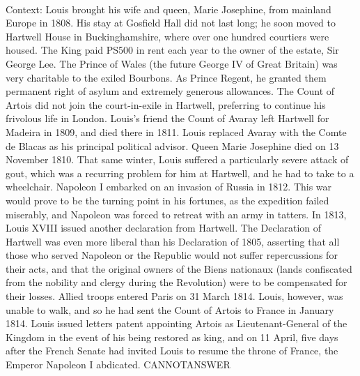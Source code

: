 \documentclass[11pt,a4paper, onecolumn]{article}
\begin{document}
\\ Context: Louis brought his wife and queen, Marie Josephine, from mainland Europe in 1808. His stay at Gosfield Hall did not last long; he soon moved to Hartwell House in Buckinghamshire, where over one hundred courtiers were housed. The King paid PS500 in rent each year to the owner of the estate, Sir George Lee. The Prince of Wales (the future George IV of Great Britain) was very charitable to the exiled Bourbons. As Prince Regent, he granted them permanent right of asylum and extremely generous allowances. The Count of Artois did not join the court-in-exile in Hartwell, preferring to continue his frivolous life in London. Louis's friend the Count of Avaray left Hartwell for Madeira in 1809, and died there in 1811. Louis replaced Avaray with the Comte de Blacas as his principal political advisor. Queen Marie Josephine died on 13 November 1810. That same winter, Louis suffered a particularly severe attack of gout, which was a recurring problem for him at Hartwell, and he had to take to a wheelchair. Napoleon I embarked on an invasion of Russia in 1812. This war would prove to be the turning point in his fortunes, as the expedition failed miserably, and Napoleon was forced to retreat with an army in tatters. In 1813, Louis XVIII issued another declaration from Hartwell. The Declaration of Hartwell was even more liberal than his Declaration of 1805, asserting that all those who served Napoleon or the Republic would not suffer repercussions for their acts, and that the original owners of the Biens nationaux (lands confiscated from the nobility and clergy during the Revolution) were to be compensated for their losses. Allied troops entered Paris on 31 March 1814. Louis, however, was unable to walk, and so he had sent the Count of Artois to France in January 1814. Louis issued letters patent appointing Artois as Lieutenant-General of the Kingdom in the event of his being restored as king, and on 11 April, five days after the French Senate had invited Louis to resume the throne of France, the Emperor Napoleon I abdicated. CANNOTANSWER
\end{document}
